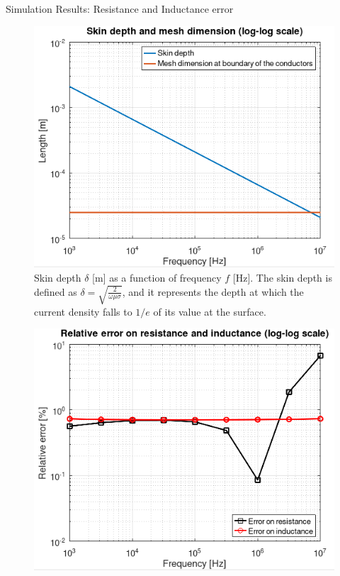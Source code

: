 \documentclass[aspectratio=54,xcolor=dvipsnames]{beamer}
\begin{document}
\begin{frame}{Simulation Results: Resistance and Inductance error}
    \scriptsize
    \begin{center}
    \begin{minipage}{0.49\textwidth}
        \centering
        \begin{figure}[H]
            \includegraphics[width=\textwidth]{Images/Skin_depth.png}
            \caption{Skin depth $\delta$ [m] as a function of frequency $f$ [Hz]. The skin depth is defined as $\delta = \sqrt{\frac{2}{\omega \mu \sigma}}$, and it represents the depth at which the current density falls to $1/e$ of its value at the surface.}
        \end{figure}
    \end{minipage}\hfill
    \begin{minipage}{0.49\textwidth}
        \centering
        \begin{figure}[H]
            \includegraphics[width=\textwidth]{Images/Error_plot.png}

\end{figure}
\end{minipage}
\end{center}
\end{frame}
\end{document}
